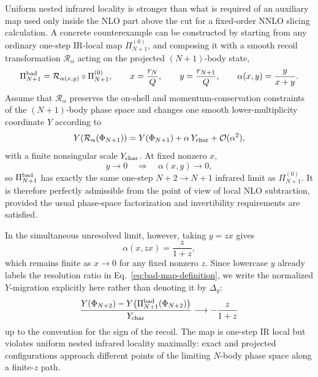 \documentclass[11pt]{article}
\newcommand{\rn}{r_N}
\newcommand{\rnp}{r_{N+1}}
\newcommand{\Ph}{\Phi}
\begin{document}
Uniform nested infrared locality is stronger than what is required of an auxiliary map used only inside the NLO part above the cut for a
fixed-order NNLO slicing calculation. A concrete counterexample can be constructed by starting from any ordinary one-step
IR-local map \(\Pi_{N+1}^{(0)}\), and composing it with a smooth recoil transformation
\(\mathcal R_\alpha\) acting on the projected \((N+1)\)-body state,
\begin{equation}
\Pi_{N+1}^{\rm bad}
=
\mathcal R_{\alpha(x,y)}\circ\Pi_{N+1}^{(0)},
\qquad
x=\frac{\rn}{Q},
\qquad
y=\frac{\rnp}{Q},
\qquad
\alpha(x,y)=\frac{y}{x+y}.
\label{eq:bad-map-definition}
\end{equation}
Assume that \(\mathcal R_\alpha\) preserves the on-shell and momentum-conservation constraints of the
\((N+1)\)-body phase space and changes one smooth lower-multiplicity coordinate \(Y\) according to
\begin{equation}
Y\!\left(\mathcal R_\alpha(\Ph_{N+1})\right)
=
Y(\Ph_{N+1})
+
\alpha\,Y_{\rm char}
+
\mathcal O(\alpha^2),
\label{eq:bad-map-recoil}
\end{equation}
with a finite nonsingular scale \(Y_{\rm char}\). At fixed nonzero \(x\),
\begin{equation}
y\to0
\quad\Longrightarrow\quad
\alpha(x,y)\to0,
\label{eq:bad-map-one-step-local}
\end{equation}
so \(\Pi_{N+1}^{\rm bad}\) has exactly the same one-step \(N+2\to N+1\) infrared limit as
\(\Pi_{N+1}^{(0)}\). It is therefore perfectly admissible from the point of view of local NLO subtraction,
provided the usual phase-space factorization and invertibility requirements are satisfied.

In the simultaneous unresolved limit, however, taking \(y=z x\) gives
\begin{equation}
\alpha(x,zx)=\frac{z}{1+z},
\label{eq:bad-map-simultaneous-alpha}
\end{equation}
which remains finite as \(x\to0\) for any fixed nonzero \(z\). Since lowercase $y$ already labels the
resolution ratio in Eq.~\eqref{eq:bad-map-definition}, we write the normalized $Y$-migration explicitly
here rather than denoting it by \(\Delta_y\):
\begin{equation}
\frac{
Y(\Ph_{N+2})
-Y\!\left(\Pi_{N+1}^{\rm bad}(\Ph_{N+2})\right)
}{Y_{\rm char}}
\longrightarrow
-\frac{z}{1+z}
\label{eq:bad-map-violates-nested-locality}
\end{equation}
up to the convention for the sign of the recoil. The map is one-step IR local but violates uniform nested
infrared locality maximally: exact and projected configurations approach different points of the limiting
\(N\)-body phase space along a finite-\(z\) path.
\end{document}
